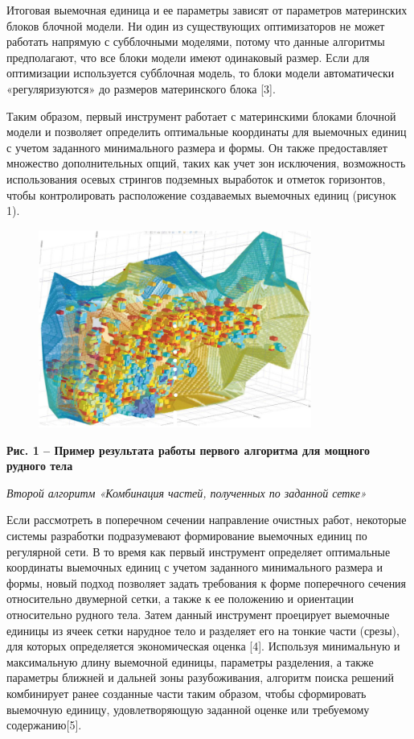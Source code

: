 Итоговая выемочная единица и ее параметры зависят от параметров
материнских блоков блочной модели. Ни один из существующих оптимизаторов
не может работать напрямую с субблочными моделями, потому что данные
алгоритмы предполагают, что все блоки модели имеют одинаковый размер.
Если для оптимизации используется субблочная модель, то блоки модели
автоматически «регуляризуются» до размеров материнского блока {[}3{]}.

Таким образом, первый инструмент работает с материнскими блоками блочной
модели и позволяет определить оптимальные координаты для выемочных
единиц с учетом заданного минимального размера и формы. Он также
предоставляет множество дополнительных опций, таких как учет зон
исключения, возможность использования осевых стрингов подземных
выработок и отметок горизонтов, чтобы контролировать расположение
создаваемых выемочных единиц (рисунок 1).

\begin{figure}[H]
	\centering
	\includegraphics[width=0.8\textwidth]{assets/1250}
	\caption*{}
\end{figure}

{\bfseries Рис. 1 -- Пример результата работы первого алгоритма для мощного
рудного тела}

\emph{Второй алгоритм «Комбинация частей, полученных по заданной сетке»}

Если рассмотреть в поперечном сечении направление очистных работ,
некоторые системы разработки подразумевают формирование выемочных единиц
по регулярной сети. В то время как первый инструмент определяет
оптимальные координаты выемочных единиц с учетом заданного минимального
размера и формы, новый подход позволяет задать требования к форме
поперечного сечения относительно двумерной сетки, а также к ее положению
и ориентации относительно рудного тела. Затем данный инструмент
проецирует выемочные единицы из ячеек сетки нарудное тело и разделяет
его на тонкие части (срезы), для которых определяется экономическая
оценка {[}4{]}. Используя минимальную и максимальную длину выемочной
единицы, параметры разделения, а также параметры ближней и дальней зоны
разубоживания, алгоритм поиска решений комбинирует ранее созданные части
таким образом, чтобы сформировать выемочную единицу, удовлетворяющую
заданной оценке или требуемому содержанию{[}5{]}.


